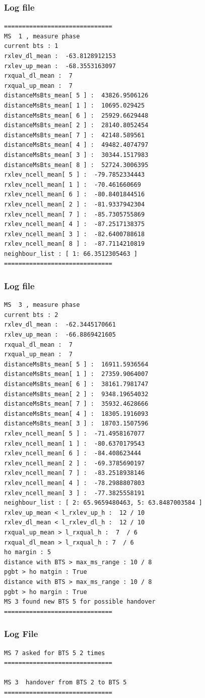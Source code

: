 \documentclass{beamer}
\begin{document}
\begin{frame}[fragile]
\frametitle{Log file}

{\tiny
\begin{verbatim}
==============================
MS  1 , measure phase
current bts : 1
rxlev_dl_mean :  -63.8128912153
rxlev_up_mean :  -68.3553163097
rxqual_dl_mean :  7
rxqual_up_mean :  7
distanceMsBts_mean[ 5 ] :  43826.9506126
distanceMsBts_mean[ 1 ] :  10695.029425
distanceMsBts_mean[ 6 ] :  25929.6629448
distanceMsBts_mean[ 2 ] :  28140.8052454
distanceMsBts_mean[ 7 ] :  42148.589561
distanceMsBts_mean[ 4 ] :  49482.4074797
distanceMsBts_mean[ 3 ] :  30344.1517983
distanceMsBts_mean[ 8 ] :  52724.3006395
rxlev_ncell_mean[ 5 ] :  -79.7852334443
rxlev_ncell_mean[ 1 ] :  -70.461660669
rxlev_ncell_mean[ 6 ] :  -80.8401844516
rxlev_ncell_mean[ 2 ] :  -81.9337942304
rxlev_ncell_mean[ 7 ] :  -85.7305755869
rxlev_ncell_mean[ 4 ] :  -87.2517138375
rxlev_ncell_mean[ 3 ] :  -82.6400788618
rxlev_ncell_mean[ 8 ] :  -87.7114210819
neighbour_list : [ 1: 66.3512305463 ]
==============================
\end{verbatim}
}

\end{frame}

\begin{frame}[fragile]
\frametitle{Log file}

{\tiny
\begin{verbatim}
MS  3 , measure phase
current bts : 2
rxlev_dl_mean :  -62.3445170661
rxlev_up_mean :  -66.8869421605
rxqual_dl_mean :  7
rxqual_up_mean :  7
distanceMsBts_mean[ 5 ] :  16911.5936564
distanceMsBts_mean[ 1 ] :  27359.9064007
distanceMsBts_mean[ 6 ] :  38161.7981747
distanceMsBts_mean[ 2 ] :  9348.19654032
distanceMsBts_mean[ 7 ] :  35932.4628666
distanceMsBts_mean[ 4 ] :  18305.1916093
distanceMsBts_mean[ 3 ] :  18703.1507596
rxlev_ncell_mean[ 5 ] :  -71.4958167077
rxlev_ncell_mean[ 1 ] :  -80.6370179543
rxlev_ncell_mean[ 6 ] :  -84.408623444
rxlev_ncell_mean[ 2 ] :  -69.3785690197
rxlev_ncell_mean[ 7 ] :  -83.2518938146
rxlev_ncell_mean[ 4 ] :  -78.2988807803
rxlev_ncell_mean[ 3 ] :  -77.3825558191
neighbour_list : [ 2: 65.9659480463, 5: 63.8487003584 ]
rxlev_up_mean < l_rxlev_up_h :  12 / 10
rxlev_dl_mean < l_rxlev_dl_h :  12 / 10
rxqual_up_mean > l_rxqual_h :  7  / 6
rxqual_dl_mean > l_rxqual_h : 7  / 6
ho margin : 5
distance with BTS > max_ms_range : 10 / 8
pgbt > ho matgin : True
distance with BTS > max_ms_range : 10 / 8
pgbt > ho margin : True
MS 3 found new BTS 5 for possible handover
==============================
\end{verbatim}
}
\end{frame}
\begin{frame}[fragile]
\frametitle{Log File}

{\tiny
\begin{verbatim}
MS 7 asked for BTS 5 2 times
==============================

MS 3  handover from BTS 2 to BTS 5
==============================

\end{verbatim}
}

\end{frame}
\end{document}
